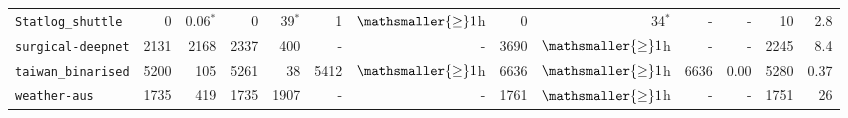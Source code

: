 \begin{tabular}{lrrrrrrrrrrrr}
\texttt{Statlog\_shuttle} & 0 & 0.06$^*$ & 0 & 39$^*$ & 1 & $\mathsmaller{\geq}1$h & 0 & 34$^*$ & - & - & 10 & 2.8\\
\texttt{surgical-deepnet} & 2131 & 2168 & 2337 & 400 & - & - & 3690 & $\mathsmaller{\geq}1$h & - & - & 2245 & 8.4\\
\texttt{taiwan\_binarised} & 5200 & 105 & 5261 & 38 & 5412 & $\mathsmaller{\geq}1$h & 6636 & $\mathsmaller{\geq}1$h & 6636 & 0.00 & 5280 & 0.37\\
\texttt{weather-aus} & 1735 & 419 & 1735 & 1907 & - & - & 1761 & $\mathsmaller{\geq}1$h & - & - & 1751 & 26\\
\bottomrule
\end{tabular}
